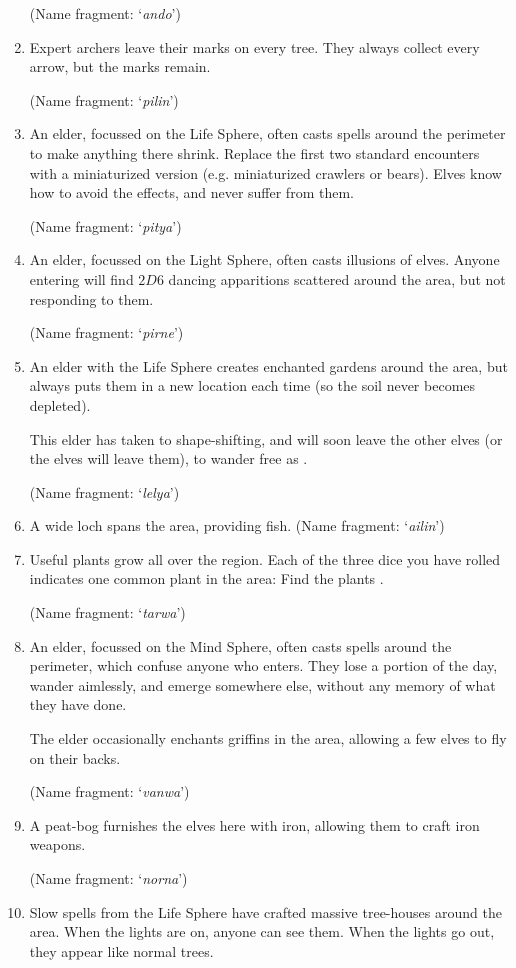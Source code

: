 \begin{multicols}{2}
\begin{enumerate}
  (Name fragment: `\textit{ando}')
  \item
  Expert archers leave their marks on every tree.
  They always collect every arrow, but the marks remain.

  (Name fragment: `\textit{pilin}')
  \item
  An elder, focussed on the Life Sphere, often casts spells around the perimeter to make anything there shrink.
  Replace the first two standard encounters with a miniaturized version (e.g. miniaturized \glspl{crawler} or bears).
  Elves know how to avoid the effects, and never suffer from them.

  (Name fragment: `\textit{pitya}')
  \item
  An elder, focussed on the Light Sphere, often casts illusions of elves.
  Anyone entering will find $2D6$ dancing apparitions scattered around the area, but not responding to them.

  (Name fragment: `\textit{pirne}')
  \item
  An elder with the Life Sphere creates enchanted gardens around the area, but always puts them in a new location each time (so the soil never becomes depleted).

  This elder has taken to shape-shifting, and will soon leave the other elves (or the elves will leave them), to wander free as .

  (Name fragment: `\textit{lelya}')
  \item
  A wide loch spans the area, providing fish.
  (Name fragment: `\textit{ailin}')
  \item
  Useful plants grow all over the region.
  Each of the three dice you have rolled indicates one common plant in the area:
  \randomPlants
  Find the plants .

  (Name fragment: `\textit{tarwa}')
  \item
  An elder, focussed on the Mind Sphere, often casts spells around the perimeter, which confuse anyone who enters.
  They lose a portion of the day, wander aimlessly, and emerge somewhere else, without any memory of what they have done.

  The elder occasionally enchants griffins in the area, allowing a few elves to fly on their backs.

  (Name fragment: `\textit{vanwa}')
  \item
  A peat-bog furnishes the elves here with iron, allowing them to craft iron weapons.

  (Name fragment: `\textit{norna}')
  \item
  Slow spells from the Life Sphere have crafted massive tree-houses around the area.
  When the lights are on, anyone can see them.
  When the lights go out, they appear like normal trees.


\end{enumerate}
\end{multicols}
